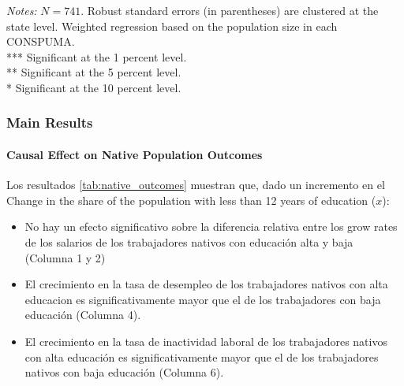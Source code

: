 \begin{frame}
\begin{table}[ht]
            \begin{minipage}{\linewidth}
                \tiny
                \textit{Notes:} $N = 741$. Robust standard errors (in parentheses) are clustered at the state level. Weighted regression based on the population size in each CONSPUMA.\\
                *** Significant at the 1 percent level. \\
                ** Significant at the 5 percent level. \\
                * Significant at the 10 percent level.
            \end{minipage}
    \end{table}
    

\end{frame}

\begin{frame}
    \frametitle{Main Results}
    \framesubtitle{Causal Effect on Native Population Outcomes}

    Los resultados \ref{tab:native_outcomes} muestran que, dado un incremento en el Change in the share of the population with less than 12 years of education ($x$):

    \begin{itemize}
    \item No hay un efecto significativo sobre la diferencia relativa entre los grow rates de los salarios de los trabajadores nativos con educación alta y baja (Columna 1 y 2)
    \item El crecimiento en la tasa de desempleo de los trabajadores nativos con alta educacion es significativamente mayor que el de los trabajadores con baja educación (Columna 4).
    \item El crecimiento en la tasa de inactividad laboral de los trabajadores nativos con alta educación es significativamente mayor que el de los trabajadores nativos con baja educación (Columna 6).
    \end{itemize}
\end{frame}
